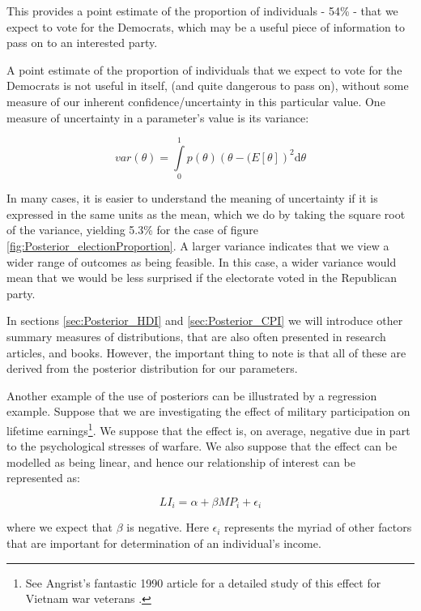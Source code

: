 \documentclass[11pt,fullpage]{book}
\begin{document}
This provides a point estimate of the proportion of individuals - 54\% - that we expect to vote for the Democrats, which may be a useful piece of information to pass on to an interested party. 

A point estimate of the proportion of individuals that we expect to vote for the Democrats is not useful in itself, (and quite dangerous to pass on), without some measure of our inherent confidence/uncertainty in this particular value. One measure of uncertainty in a parameter's value is its variance:

\begin{equation}
var(\theta)=  \int\limits_{0}^{1} p(\theta)(\theta-\mathbb(E[\theta])^2 \mathrm{d}\theta
\end{equation}

In many cases, it is easier to understand the meaning of uncertainty if it is expressed in the same units as the mean, which we do by taking the square root of the variance, yielding 5.3\% for the case of figure \ref{fig:Posterior_electionProportion}. A larger variance indicates that we view a wider range of outcomes as being feasible. In this case, a wider variance would mean that we would be less surprised if the electorate voted in the Republican party. 

In sections \ref{sec:Posterior_HDI} and \ref{sec:Posterior_CPI} we will introduce other summary measures of distributions, that are also often presented in research articles, and books. However, the important thing to note is that all of these are derived from the posterior distribution for our parameters. 

Another example of the use of posteriors can be illustrated by a regression example. Suppose that we are investigating the effect of military participation on lifetime earnings\footnote{See Angrist's fantastic 1990 article for a detailed study of this effect for Vietnam war veterans \cite{angrist1990lifetime}.}. We suppose that the effect is, on average, negative due in part to the psychological stresses of warfare. We also suppose that the effect can be modelled as being linear, and hence our relationship of interest can be represented as:

\begin{equation}\label{eq:Posterior_militaryParticipation}
LI_i = \alpha + \beta MP_i + \epsilon_i
\end{equation}

where we expect that $\beta$ is negative. Here $\epsilon_i$ represents the myriad of other factors that are important for determination of an individual's income.
\end{document}
